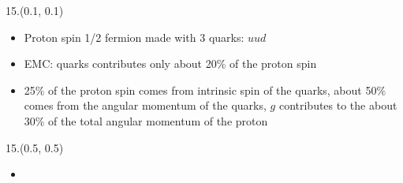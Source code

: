 \documentclass[8pt, xcolor={dvipsnames}, sans, mathserif]{beamer}
\newenvironment{List}[2]
{\begin{textblock}{#1}#2
\begin{itemize}}
{\end{itemize}
\end{textblock}}
\begin{document}
\begin{frame}
\begin{List}{15.}{(0.1, 0.1)}

  \item Proton spin 1/2 fermion made with 3 quarks: $uud$

  \item EMC: quarks contributes only about 20\% of the proton spin

  \item 25\% of the proton spin comes from intrinsic spin of the quarks, about 50\% comes from the angular momentum of the quarks, $g$ contributes to the about 30\% of the total angular momentum of the proton

\end{List}
\end{frame}

\begin{frame}
\begin{List}{15.}{(0.5, 0.5)}

  \item

\end{List}
\end{frame}
\end{document}
